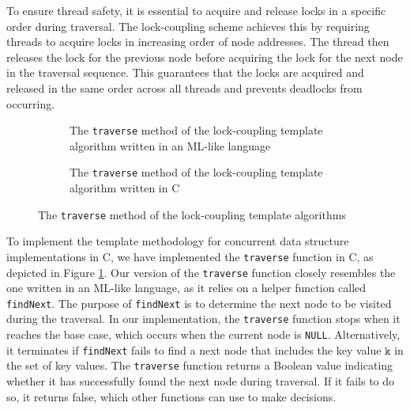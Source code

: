 \documentclass[a4paper,UKenglish,cleveref, autoref, thm-restate]{lipics-v2021}
\newcommand{\than}[1]{\textbf{\textcolor{blue}{[Than: #1]}}}
\newcommand{\wm}[1]{\textbf{\textcolor{violet}{[Willam: #1]}}}
\begin{document}
To ensure thread safety, it is essential to acquire and release locks in a specific order during traversal. The lock-coupling scheme achieves this by requiring threads to acquire locks in increasing order of node addresses. The thread then releases the lock for the previous node before acquiring the lock for the next node in the traversal sequence. This guarantees that the locks are acquired and released in the same order across all threads and prevents deadlocks from occurring.

\begin{figure}[ht]
	\begin{subfigure}[t]{0.45\textwidth}
		 
		\caption{The \lstinline{traverse} method of the lock-coupling template algorithm written in an ML-like language \cite{krishna2019compositional}} 
		\label{traverse_lock_a}	
	\end{subfigure}\qquad
	\begin{subfigure}[t]{0.48\textwidth}
		 
		\caption{The \lstinline{traverse} method of the lock-coupling template algorithm written in C}
		\label{traverse_lock_b}
	\end{subfigure}
	\caption{The \lstinline{traverse} method of the lock-coupling template algorithms}
	\label{traverse_lock}
\end{figure}

To implement the template methodology for concurrent data structure implementations in C, we have implemented the \lstinline{traverse} function in C, as depicted in Figure \ref{traverse_lock_a}.  Our version of the \lstinline{traverse} function closely resembles the one written in an ML-like language, as it relies on a helper function called \lstinline{findNext}. The purpose of \lstinline{findNext} is to determine the next node to be visited during the traversal. In our implementation, the \lstinline{traverse} function stops when it reaches the base case, which occurs when the current node is \lstinline{NULL}. Alternatively, it terminates if \lstinline{findNext} fails to find a next node that includes the key value $\texttt{k}$ in the set of key values. The \lstinline{traverse} function returns a Boolean value indicating whether it has successfully found the next node during traversal. If it fails to do so, it returns false, which other functions can use to make decisions.
\end{document}
